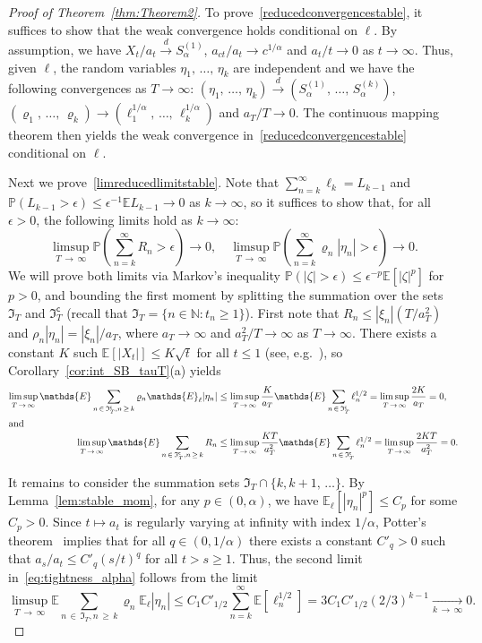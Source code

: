 \documentclass[10pt]{amsart}
\theoremstyle{definition}\newtheorem{defi}[theo]{Definition}\newtheorem{rema}[theo]{Remark}\newtheorem{exam}[theo]{Example}\newtheorem{exem}[theo]{Example}\newtheorem{nota}[theo]{Notation}
\newcommand\N{\mathbb{N}}
\newcommand\E{\mathds{E}}
\newcommand\p{\mathds{P}}
\newcommand\1{\mathds{1}}
\newcommand\GI{\mathfrak{I}}
\newcommand\co{\mathsf{c}}
\newcommand\cid{\xrightarrow{d}}
\begin{document}
\begin{proof}[Proof of Theorem~\ref{thm:Theorem2}]
To prove~\eqref{reducedconvergencestable}, it suffices to show that the weak convergence holds conditional on $\ell$. By assumption, we have $X_t/a_t\cid S_\alpha^{(1)}$, $a_{ct}/a_t\to c^{1/\alpha}$ and $a_t/t\to 0$ as $t\to\infty$. Thus, given $\ell$, the random variables $\eta_1,\,\ldots,\,\eta_k$ are independent and we have the following convergences as $T\to\infty$: $(\eta_1,\,\ldots,\,\eta_k) \cid (S_\alpha^{(1)},\,\ldots,\,S_\alpha^{(k)})$, $(\varrho_1,\,\ldots,\,\varrho_k) \to(\ell_1^{1/\alpha},\,\ldots,\,\ell_k^{1/\alpha})$ and $a_T/T\to 0$. The continuous mapping theorem then yields the weak convergence in~\eqref{reducedconvergencestable} conditional on $\ell$.

Next we prove~\eqref{limreducedlimitstable}. Note that $\sum_{n=k}^\infty \ell_k=L_{k-1}$ and $\p(L_{k-1}>\epsilon)\le \epsilon^{-1}\E L_{k-1}\to 0$ as $k\to\infty$, so it suffices to show that, for all $\epsilon>0$, the following limits hold as $k\to\infty$:
\begin{equation}\label{eq:tightness_alpha}
\limsup_{T\,\to\,\infty}
\p\left(\sum_{n=k}^\infty R_n >\epsilon\right)
\to0,
\quad
\limsup_{T\,\to\,\infty}
\p\left(\sum_{n=k}^\infty\varrho_n|\eta_n| >\epsilon\right)
\to0.
\end{equation}
We will prove both limits via Markov's inequality $\p(|\zeta|>\epsilon)\le \epsilon^{-p}\E[|\zeta|^p]$ for $p>0$, and bounding the first moment by splitting the summation over the sets $\GI_T$ and $\GI_T^\co$ (recall that $\GI_T=\{n\in\N:t_n\ge 1\}$). First note that $R_n\le |\xi_n|(T/a_T^2)$ and $\rho_n|\eta_n|=|\xi_n|/a_T$, where $a_T\to\infty$ and $a_T^2/T\to\infty$ as $T\to\infty$. There exists a constant $K$ such $\E[|X_t|]\le K\sqrt{t}$ for all $t\le1$ (see, e.g.~\cite[Lemma~2]{LevySupSim}), so Corollary~\ref{cor:int_SB_tauT}(a) yields
\begin{align*}
\limsup_{T\,\to\,\infty}
\E\sum_{n\,\in\,\GI_T^\co, n\,\ge\,k}
\varrho_n\E_\ell|\eta_n|
&\le \limsup_{T\,\to\,\infty}
\frac{K}{a_T}\E\sum_{n\,\in\,\GI_T^\co} \ell_n^{1/2} =\limsup_{T\,\to\,\infty}\frac{2K}{a_T}=0,\\
\intertext{and}
\limsup_{T\,\to\,\infty}
\E\sum_{n\,\in\,\GI_T^\co, n\,\ge\,k}R_n
&\le \limsup_{T\,\to\,\infty}
\frac{KT}{a_T^2}\E\sum_{n\,\in\,\GI_T^\co} \ell_n^{1/2} =\limsup_{T\,\to\,\infty}\frac{2KT}{a_T^2}=0.
\end{align*}

It remains to consider the summation sets $\GI_T\cap\{k,k+1,\,\ldots\}$. By Lemma~\ref{lem:stable_mom}, for any $p\in(0,\alpha)$, we have $\E_\ell[|\eta_n|^p]\le C_p$ for some $C_p>0$. Since $t\mapsto a_t$ is regularly varying at infinity with index $1/\alpha$, Potter's theorem~\cite[Theorem~1.5.6]{BinghamBook} implies that for all $q\in(0,1/\alpha)$ there exists a constant $C'_{q}>0$ such that $a_s/a_t\le C'_{q}(s/t)^{q}$ for all $t>s\ge 1$. Thus, the second limit in~\eqref{eq:tightness_alpha} follows from the limit
\[
\limsup_{T\,\to\,\infty}
\E\sum_{n\,\in\,\GI_T, n\,\ge\,k}
\varrho_n\E_\ell|\eta_n|
\le C_1C'_{1/2}
\sum_{n=k}^\infty \E\left[\ell_n^{1/2}\right] =3C_1C'_{1/2}(2/3)^{k-1}
\xrightarrow[k\,\to\,\infty]{}0.
\]


\end{proof}
\end{document}
